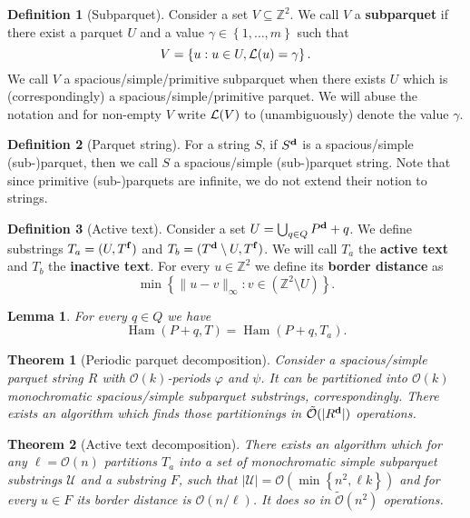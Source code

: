 \documentclass[11pt]{article}
\newcommand{\Z}{\mathbb{Z}}
\renewcommand{\O}{\mathcal{O}}
\newcommand{\tO}{\tilde{\mathcal{O}}}
\renewcommand{\phi}{\varphi}
\newcommand{\set}[1]{\left\lbrace #1 \right\rbrace}
\DeclareMathOperator*{\Ham}{Ham}
\theoremstyle{plain}
\newtheorem{theorem}{Theorem}
\newtheorem{lemma}{Lemma}
\theoremstyle{definition}
\newtheorem{definition}{Definition}
\begin{document}
\begin{definition}[Subparquet]
	Consider a set $V \subseteq \Z^2$. 
	We call $V$ a \textbf{subparquet} if there exist a parquet $U$ and a value $\gamma \in \set{1, \dots, m}$ such that
	$$ V = \set{u : u \in U, \L(u) = \gamma}.$$
	We call $V$ a spacious/simple/primitive subparquet when there exists $U$ which is (correspondingly) a spacious/simple/primitive parquet.
	We will abuse the notation and for non-empty $V$ write $\mathcal{L}(V)$ to (unambiguously) denote the value $\gamma$. 
\end{definition}


\begin{definition}[Parquet string]
	For a string $S$, if $S^\mathbf{d}$ is a spacious/simple (sub-)parquet, then we call $S$ a spacious/simple (sub-)parquet string.
	Note that since primitive (sub-)parquets are infinite, we do not extend their notion to strings.
\end{definition}


\newcommand{\Ta}{T_a}
\newcommand{\Tb}{T_b}
\begin{definition}[Active text]
	Consider a set $U = \bigcup_{q \in Q} P^\mathbf{d} + q$. 
	We define substrings $\Ta = (U, \f{T})$ and $\Tb = (\d{T} \setminus U, \f{T})$.
	We will call $\Ta$ the \textbf{active text} and $\Tb$ the \textbf{inactive text}.
	For every $u \in \Z^2$ we define its \textbf{border distance} as
	$$\min\set{\|u - v\|_\infty : v \in (\Z^2 \setminus U)}.$$
\end{definition}


\begin{lemma}
	For every $q \in Q$ we have
	$$ \Ham(P + q, T) = \Ham(P + q, \Ta).$$
\end{lemma}


\begin{theorem}[Periodic parquet decomposition]
	\label{parquet_decomposition}
	Consider a spacious/simple parquet string $R$ with $\O(k)$-periods $\phi$ and $\psi$.
	It can be partitioned into $\O(k)$ monochromatic spacious/simple subparquet substrings, correspondingly.
	There exists an algorithm which finds those partitionings in $\tO(|\d{R}|)$ operations.
\end{theorem}


\newcommand{\T}{\mathcal{T}}
\renewcommand{\S}{\mathcal{S}}
\renewcommand{\P}{\mathcal{P}}
\newcommand{\U}{\mathcal{U}}
\newcommand{\V}{\mathcal{V}}
\newcommand{\F}{\mathcal{F}}

\begin{theorem}[Active text decomposition]
	\label{text_decomposition}
	There exists an algorithm which for any $\ell = \O(n)$ partitions $\Ta$ into a set of monochromatic simple subparquet substrings $\U$ and a substring $F$,
	such that $|\U| = \O(\min\set{n^2, \ell k})$ and for every $u \in F$ its border distance is $\O(n / \ell)$.
	It does so in $\tO(n^2)$ operations.
\end{theorem}
\end{document}
